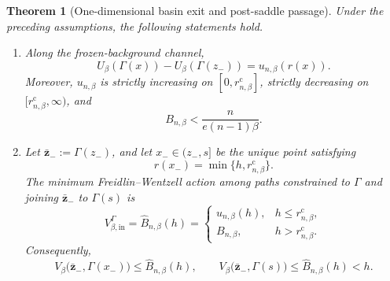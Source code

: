 \documentclass{article}
\theoremstyle{plain}
\newtheorem{theorem}{Theorem}[section]
\theoremstyle{definition}
\theoremstyle{remark}
\begin{document}
\begin{theorem}[One-dimensional basin exit and post-saddle passage]
\label{thm:transition-time}
Under the preceding assumptions, the following statements hold.

\begin{enumerate}
    \item Along the frozen-background channel,
    \begin{equation}
        U_\beta(\Gamma(x))-U_\beta(\Gamma(z_-))
        =
        u_{n,\beta}(r(x)).
        \label{eq:restricted-potential-identity}
    \end{equation}
    Moreover, \(u_{n,\beta}\) is strictly increasing on
    \([0,r_{n,\beta}^{\mathrm c}]\), strictly decreasing on
    \([r_{n,\beta}^{\mathrm c},\infty)\), and
    \begin{equation}
        B_{n,\beta}
        <
        \frac{n}{e(n-1)\beta}.
        \label{eq:reduced-barrier-cap}
    \end{equation}

    \item Let \(\bar{\mathbf z}_-:=\Gamma(z_-)\), and let \(x_-\in(z_-,s]\) be the unique point satisfying
    \[
        r(x_-)=\min\{h,r_{n,\beta}^{\mathrm c}\}.
    \]
    The minimum Freidlin--Wentzell action among paths constrained to \(\Gamma\) and joining \(\bar{\mathbf z}_-\) to \(\Gamma(s)\) is
    \begin{equation}
        V_{\beta,\mathrm{in}}^\Gamma
        =
        \widehat B_{n,\beta}(h)
        =
        \begin{cases}
            u_{n,\beta}(h),
            & h\le r_{n,\beta}^{\mathrm c},
            \\
            B_{n,\beta},
            & h>r_{n,\beta}^{\mathrm c}.
        \end{cases}
        \label{eq:initial-channel-action}
    \end{equation}
    Consequently,
    \begin{equation}
        V_\beta\bigl(\bar{\mathbf z}_-,\Gamma(x_-)\bigr)
        \le
        \widehat B_{n,\beta}(h),
        \qquad
        V_\beta\bigl(\bar{\mathbf z}_-,\Gamma(s)\bigr)
        \le
        \widehat B_{n,\beta}(h)
        <
        h.
        \label{eq:full-initial-quasipotential-bound}
    \end{equation}


\end{enumerate}
\end{theorem}
\end{document}
